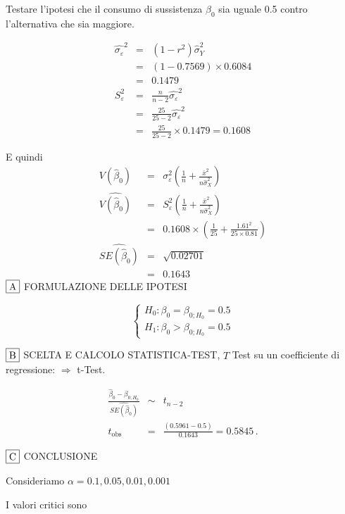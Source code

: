 \documentclass[
  11pt,
]{book}
\theoremstyle{mytheoremstyle}
\theoremstyle{mydefstyle}
\newenvironment{sol}
  {
  \begin{tcolorbox}[enhanced,breakable,arc=0.1mm,boxrule=1pt,colback=white,colframe=iblue,
  title=\bf \fontfamily{lmss}\selectfont \hspace{.5 cm} Soluzione,drop fuzzy shadow]

}{
\end{tcolorbox}
  }
\begin{document}
Testare l'ipotesi che il consumo di sussistenza \(\beta_0\) sia uguale 0.5 contro l'alternativa
che sia maggiore.

\begin{sol}
\begin{eqnarray*}
\hat{\sigma_\varepsilon}^2&=&(1-r^2)\hat\sigma_Y^2\\
&=& (1- 0.7569 )\times 0.6084 \\
   &=&  0.1479 \\
   S_\varepsilon^2 &=& \frac{n} {n-2} \hat{\sigma_\varepsilon}^2\\
   &=&  \frac{ 25 } { 25 -2} \hat{\sigma_\varepsilon}^2 \\
 &=&  \frac{ 25 } { 25 -2} \times  0.1479  =  0.1608  
\end{eqnarray*}

E quindi\begin{eqnarray*}
V(\hat\beta_{0}) &=& \sigma_{\varepsilon}^{2} \left( \frac{1} {n}  +  \frac{\bar{x}^{2}} {n \hat{\sigma}^{2}_{X}} \right)\\
\widehat{V(\hat\beta_{0})} &=& S_{\varepsilon}^{2}\left( \frac{1} {n}  +  \frac{\bar{x}^{2}} {n \hat{\sigma}^{2}_{X}} \right)\ \\
 &=&  0.1608 \times\left( \frac{1} { 25 }  +  \frac{ 1.61 ^{2}} { 25 \times  0.81 } \right)\\
 \widehat{SE(\hat\beta_{0})}        &=&  \sqrt{ 0.02701 }\\
 &=&  0.1643 
\end{eqnarray*} \(\fbox{A}\) FORMULAZIONE DELLE IPOTESI

\[\begin{cases}
   H_0: \beta_0 = \beta_{0;H_0}=0.5 \\
   H_1: \beta_0 > \beta_{0;H_0}=0.5 
   \end{cases}\]

\(\fbox{B}\) SCELTA E CALCOLO STATISTICA-TEST, \(T\)
Test su un coefficiente di regressione: \(\Rightarrow\) t-Test.

\begin{eqnarray*}
 \frac{\hat\beta_{ 0 } - \beta_{ 0 ;H_0}} {\widehat{SE(\hat\beta_{ 0 })}}&\sim&t_{n-2}\\
   t_{\text{obs}}
&=& \frac{ ( 0.5961 -  0.5 )} { 0.1643 }
 =   0.5845 \, .
\end{eqnarray*}

\(\fbox{C}\) CONCLUSIONE

Consideriamo \(\alpha=0.1, 0.05, 0.01, 0.001\)

I valori critici sono


\end{sol}
\end{document}
